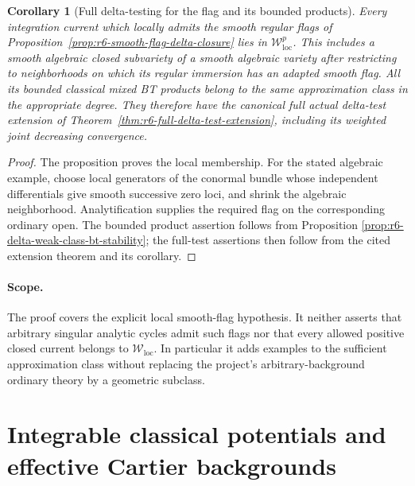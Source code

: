 \documentclass[11pt,a4paper]{article}
\numberwithin{equation}{section}
\newtheorem{corollary}[theorem]{Corollary}
\theoremstyle{definition}
\theoremstyle{remark}
\begin{document}
\begin{corollary}[Full delta-testing for the flag and its bounded products]
\label{cor:r6-smooth-flag-full-delta}
Every integration current which locally admits the smooth regular
flags of Proposition~\ref{prop:r6-smooth-flag-delta-closure} lies in
$\mathcal W^p_{\mathrm{loc}}$.  This includes a smooth algebraic
closed subvariety of a smooth algebraic variety after restricting
to neighborhoods on which its regular immersion has an adapted
smooth flag.  All its bounded classical mixed BT products belong
to the same approximation class in the appropriate degree.
They therefore have the canonical full actual delta-test extension
of Theorem~\ref{thm:r6-full-delta-test-extension}, including its
weighted joint decreasing convergence.
\end{corollary}

\begin{proof}
The proposition proves the local membership.  For the stated
algebraic example, choose local generators of the conormal bundle
whose independent differentials give smooth successive zero loci,
and shrink the algebraic neighborhood.  Analytification supplies
the required flag on the corresponding ordinary open.  The bounded
product assertion follows from Proposition
\ref{prop:r6-delta-weak-class-bt-stability}; the full-test assertions
then follow from the cited extension theorem and its corollary.
\end{proof}

\paragraph{Scope.}
The proof covers the explicit local smooth-flag hypothesis.  It
neither asserts that arbitrary singular analytic cycles admit such
flags nor that every allowed positive closed current belongs to
$\mathcal W_{\mathrm{loc}}$.  In particular it adds examples to
the sufficient approximation class without replacing the project's
arbitrary-background ordinary theory by a geometric subclass.



\section{Integrable classical potentials and effective Cartier backgrounds}
\label{sec:r6-delta-integrable-potentials}
\end{document}
